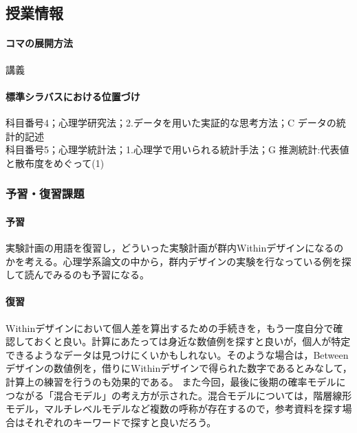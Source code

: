 \subsection{授業情報}
\paragraph{コマの展開方法}
講義
\paragraph{標準シラバスにおける位置づけ}
科目番号4；心理学研究法；2.データを用いた実証的な思考方法；C データの統計的記述\\
科目番号5；心理学統計法；1.心理学で用いられる統計手法；G 推測統計:代表値と散布度をめぐって(1)
\subsubsection{予習・復習課題}
\paragraph{予習}
実験計画の用語を復習し，どういった実験計画が群内Withinデザインになるのかを考える。心理学系論文の中から，群内デザインの実験を行なっている例を探して読んでみるのも予習になる。
\paragraph{復習}
Withinデザインにおいて個人差を算出するための手続きを，もう一度自分で確認しておくと良い。計算にあたっては身近な数値例を探すと良いが，個人が特定できるようなデータは見つけにくいかもしれない。そのような場合は，Betweenデザインの数値例を，借りにWithinデザインで得られた数字であるとみなして，計算上の練習を行うのも効果的である。
また今回，最後に後期の確率モデルにつながる「混合モデル」の考え方が示された。混合モデルについては，階層線形モデル，マルチレベルモデルなど複数の呼称が存在するので，参考資料を探す場合はそれぞれのキーワードで探すと良いだろう。